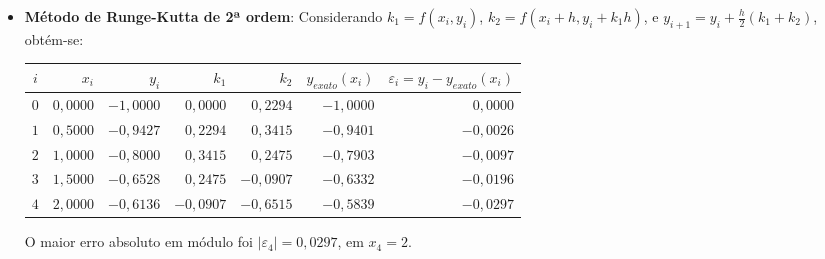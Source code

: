\documentclass[12pt,a4paper]{article}
\begin{document}
\begin{enumerate}
\begin{enumerate}
\begin{itemize}
\item \textbf{Método de Runge-Kutta de 2ª ordem}: Considerando
$k_1 = f(x_i, y_i)$,
$k_2 = f(x_i + h, y_i + k_1 h)$, e
$y_{i+1} = y_i + \frac{h}{2} (k_1 + k_2)$, obtém-se:
\medskip
\begin{center}
    \begin{tabular}{crrrrrr}
    \hline
      $i$ & $x_i$  & $y_i$ & $k_1$ & $k_2$ & $y_{exato}(x_i)$
      & $\varepsilon_i = y_i-y_{exato}(x_i)$ \\ \hline
    $0$ & $0,0000$ & $-1,0000$ & $ 0,0000$ & $ 0,2294$ & $-1,0000$ & $ 0,0000$ \\
    $1$ & $0,5000$ & $-0,9427$ & $ 0,2294$ & $ 0,3415$ & $-0,9401$ & $-0,0026$ \\
    $2$ & $1,0000$ & $-0,8000$ & $ 0,3415$ & $ 0,2475$ & $-0,7903$ & $-0,0097$ \\
    $3$ & $1,5000$ & $-0,6528$ & $ 0,2475$ & $-0,0907$ & $-0,6332$ & $-0,0196$ \\
    $4$ & $2,0000$ & $-0,6136$ & $-0,0907$ & $-0,6515$ & $-0,5839$ & $-0,0297$ \\
    \hline
    \end{tabular}
\end{center}
\medskip
O maior erro absoluto em módulo foi $|\varepsilon_4| = 0,0297$, em $x_4 = 2$.


\end{itemize}
\end{enumerate}
\end{enumerate}
\end{document}
